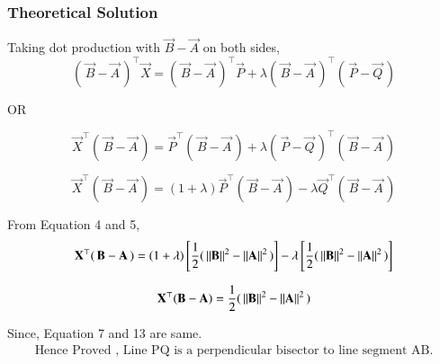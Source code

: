 \documentclass{beamer}
\begin{document}
\begin{frame}[fragile]
    \frametitle{Theoretical Solution}
Taking dot production with $\vec{B} - \vec{A}$ on both sides,
\begin{equation}
    (\, \vec{B} - \vec{A} \,)^\top \vec{X} = (\, \vec{B} - \vec{A} \,)^\top \vec{P} + \lambda(\, \vec{B} - \vec{A} \,)^\top(\, \vec{P} - \vec{Q} \,)
\end{equation}
\begin{center}
    OR
\end{center}
\begin{equation}
    \vec{X}^\top(\, \vec{B} - \vec{A} \,) = \vec{P}^\top(\, \vec{B} - \vec{A} \,) + \lambda(\, \vec{P} - \vec{Q} \,)^\top(\, \vec{B} - \vec{A} \,)
\end{equation}

\begin{equation}
   \vec{X}^\top(\, \vec{B} - \vec{A} \,) = (1+\lambda)\vec{P}^\top(\, \vec{B} - \vec{A} \,) - \lambda\vec{Q}^\top(\, \vec{B} - \vec{A} \,)
\end{equation}


From Equation 4 and 5,
\begin{equation}
    \mathbf{X}^\top(\, \mathbf{B} - \mathbf{A} \,) = (1+\lambda)\left[\dfrac{1}{2}(\, \left\lVert\mathbf{B}\right\rVert^2 - \left\lVert\mathbf{A}\right\rVert^2 \,)\right]  - \lambda\left[\dfrac{1}{2}(\, \left\lVert\mathbf{B}\right\rVert^2 - \left\lVert\mathbf{A}\right\rVert^2 \,)\right]
\end{equation}

\begin{equation}
    \mathbf{X}^\top(\mathbf{B}-\mathbf{A}) = \dfrac{1}{2}(\, \left\lVert\mathbf{B}\right\rVert^2 - \left\lVert\mathbf{A}\right\rVert^2 \,)
\end{equation}

\bigskip

Since, Equation 7 and 13 are same.
\begin{align*}
    \boxed{\text{Hence Proved , Line PQ is a perpendicular bisector to line segment AB.}}
\end{align*}
\end{frame}
\end{document}
